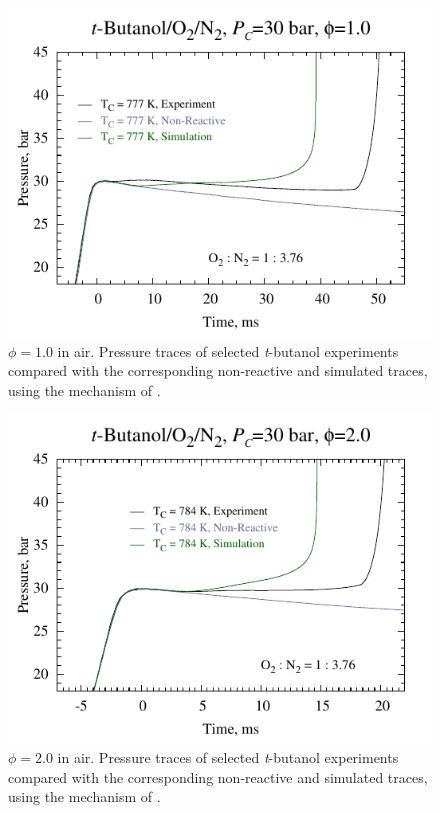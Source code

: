 \documentclass[12pt, letterpaper]{article}
\begin{document}
\begin{figure}
    \centering
    \includegraphics[width=12cm]{03-Butanol/tbuoh-10press}
    \caption{$\phi=1.0$ in air. Pressure traces of selected
        \textit{t}-butanol experiments compared with the corresponding
        non-reactive and simulated traces, using the mechanism of
        \textcite{Sarathy2012}.}
    \label{fig:tbuoh-10press}
\end{figure}

\begin{figure}
    \centering
    \includegraphics[width=12cm]{03-Butanol/tbuoh-20press}
    \caption{$\phi=2.0$ in air. Pressure traces of selected
        \textit{t}-butanol experiments compared with the corresponding
        non-reactive and simulated traces, using the mechanism of
        \textcite{Sarathy2012}.}
    \label{fig:tbuoh-20press}
\end{figure}
\end{document}
